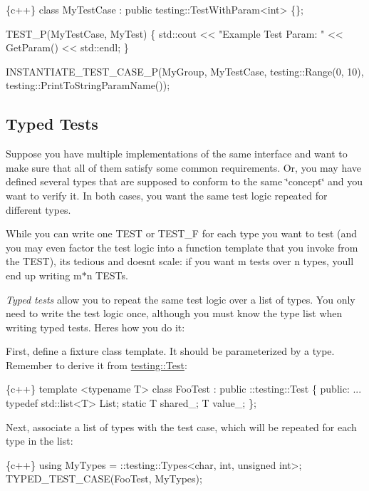 \begin{DoxyCode}
\{c++\}
class MyTestCase : public testing::TestWithParam<int> \{\};

TEST\_P(MyTestCase, MyTest)
\{
  std::cout << "Example Test Param: " << GetParam() << std::endl;
\}

INSTANTIATE\_TEST\_CASE\_P(MyGroup, MyTestCase, testing::Range(0, 10),
                        testing::PrintToStringParamName());
\end{DoxyCode}


\subsection*{Typed Tests}

Suppose you have multiple implementations of the same interface and want to make sure that all of them satisfy some common requirements. Or, you may have defined several types that are supposed to conform to the same \char`\"{}concept\char`\"{} and you want to verify it. In both cases, you want the same test logic repeated for different types.

While you can write one {\ttfamily T\+E\+ST} or {\ttfamily T\+E\+S\+T\+\_\+F} for each type you want to test (and you may even factor the test logic into a function template that you invoke from the {\ttfamily T\+E\+ST}), it\textquotesingle{}s tedious and doesn\textquotesingle{}t scale\+: if you want {\ttfamily m} tests over {\ttfamily n} types, you\textquotesingle{}ll end up writing {\ttfamily m$\ast$n} {\ttfamily T\+E\+ST}s.

{\itshape Typed tests} allow you to repeat the same test logic over a list of types. You only need to write the test logic once, although you must know the type list when writing typed tests. Here\textquotesingle{}s how you do it\+:

First, define a fixture class template. It should be parameterized by a type. Remember to derive it from {\ttfamily \mbox{\hyperlink{classtesting_1_1_test}{testing\+::\+Test}}}\+:


\begin{DoxyCode}
\{c++\}
template <typename T>
class FooTest : public ::testing::Test \{
 public:
  ...
  typedef std::list<T> List;
  static T shared\_;
  T value\_;
\};
\end{DoxyCode}


Next, associate a list of types with the test case, which will be repeated for each type in the list\+:


\begin{DoxyCode}
\{c++\}
using MyTypes = ::testing::Types<char, int, unsigned int>;
TYPED\_TEST\_CASE(FooTest, MyTypes);
\end{DoxyCode}


